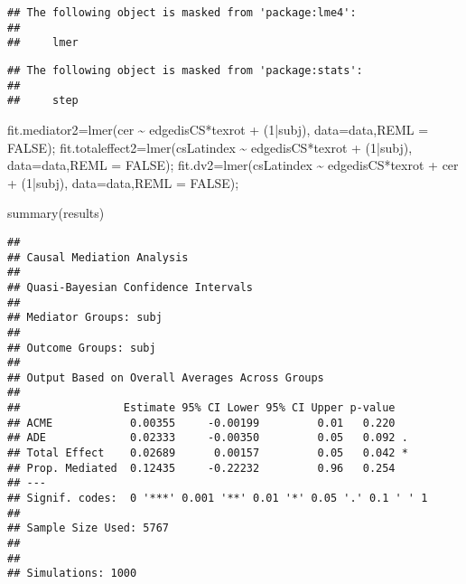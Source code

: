 \documentclass[
]{article}
\newenvironment{Shaded}{\begin{snugshade}}{\end{snugshade}}
\newcommand{\AttributeTok}[1]{\textcolor[rgb]{0.77,0.63,0.00}{#1}}
\newcommand{\ConstantTok}[1]{\textcolor[rgb]{0.00,0.00,0.00}{#1}}
\newcommand{\DecValTok}[1]{\textcolor[rgb]{0.00,0.00,0.81}{#1}}
\newcommand{\FunctionTok}[1]{\textcolor[rgb]{0.00,0.00,0.00}{#1}}
\newcommand{\NormalTok}[1]{#1}
\newcommand{\OtherTok}[1]{\textcolor[rgb]{0.56,0.35,0.01}{#1}}
\newcommand{\SpecialCharTok}[1]{\textcolor[rgb]{0.00,0.00,0.00}{#1}}
\begin{document}
\begin{verbatim}
## The following object is masked from 'package:lme4':
## 
##     lmer
\end{verbatim}

\begin{verbatim}
## The following object is masked from 'package:stats':
## 
##     step
\end{verbatim}

\begin{Shaded}
\begin{Highlighting}[]
\NormalTok{ fit.mediator2}\OtherTok{=}\FunctionTok{lmer}\NormalTok{(cer }\SpecialCharTok{\textasciitilde{}}\NormalTok{ edgedisCS}\SpecialCharTok{*}\NormalTok{texrot  }\SpecialCharTok{+}\NormalTok{ (}\DecValTok{1}\SpecialCharTok{|}\NormalTok{subj), }\AttributeTok{data=}\NormalTok{data,}\AttributeTok{REML =} \ConstantTok{FALSE}\NormalTok{);}
\NormalTok{ fit.totaleffect2}\OtherTok{=}\FunctionTok{lmer}\NormalTok{(csLatindex }\SpecialCharTok{\textasciitilde{}}\NormalTok{ edgedisCS}\SpecialCharTok{*}\NormalTok{texrot     }\SpecialCharTok{+}\NormalTok{ (}\DecValTok{1}\SpecialCharTok{|}\NormalTok{subj), }\AttributeTok{data=}\NormalTok{data,}\AttributeTok{REML =} \ConstantTok{FALSE}\NormalTok{);}
\NormalTok{ fit.dv2}\OtherTok{=}\FunctionTok{lmer}\NormalTok{(csLatindex }\SpecialCharTok{\textasciitilde{}}\NormalTok{ edgedisCS}\SpecialCharTok{*}\NormalTok{texrot }\SpecialCharTok{+}\NormalTok{ cer    }\SpecialCharTok{+}\NormalTok{ (}\DecValTok{1}\SpecialCharTok{|}\NormalTok{subj), }\AttributeTok{data=}\NormalTok{data,}\AttributeTok{REML =} \ConstantTok{FALSE}\NormalTok{);}
\end{Highlighting}
\end{Shaded}

\begin{Shaded}
\begin{Highlighting}[]
\FunctionTok{summary}\NormalTok{(results)}
\end{Highlighting}
\end{Shaded}

\begin{verbatim}
## 
## Causal Mediation Analysis 
## 
## Quasi-Bayesian Confidence Intervals
## 
## Mediator Groups: subj 
## 
## Outcome Groups: subj 
## 
## Output Based on Overall Averages Across Groups 
## 
##                Estimate 95% CI Lower 95% CI Upper p-value  
## ACME            0.00355     -0.00199         0.01   0.220  
## ADE             0.02333     -0.00350         0.05   0.092 .
## Total Effect    0.02689      0.00157         0.05   0.042 *
## Prop. Mediated  0.12435     -0.22232         0.96   0.254  
## ---
## Signif. codes:  0 '***' 0.001 '**' 0.01 '*' 0.05 '.' 0.1 ' ' 1
## 
## Sample Size Used: 5767 
## 
## 
## Simulations: 1000
\end{verbatim}
\end{document}
